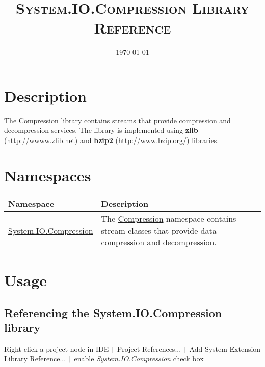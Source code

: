 \documentclass[a4paper,oneside,11.000000pt]{book}
\begin{document}
\clearpage

\frontmatter
\title{\textsc{System.IO.Compression Library Reference}
}
\date{\today}
\maketitle
\tableofcontents

\clearpage
\chapter{Description}
\begin{flushleft}
The \hyperlink{System.IO.Compression}{Compression} library contains streams that provide compression and decompression services.
The library is implemented using \textbf{zlib} (\url{http://wwww.zlib.net}) and
\textbf{bzip2} (\url{http://www.bzip.org/}) libraries.

\end{flushleft}
\chapter{Namespaces}
\begin{flushleft}
\begin{supertabular}[l]{!{\raggedright}p{5.49396cm}!{\raggedright}p{9.65604cm}}
\textbf{Namespace}
& \textbf{Description}
\\
\hline
\hyperlink{System.IO.Compression}{System.IO.Compression}
& The \hyperlink{System.IO.Compression}{Compression} namespace contains stream classes that provide data compression and decompression.

\\
\end{supertabular}

\end{flushleft}
\clearpage
\mainmatter

\chapter{Usage}

\section{Referencing the System.IO.Compression library}

Right-click a project node in IDE \verb.|. Project References... \verb.|.
Add System Extension Library Reference... \verb.|.
enable \emph{System.IO.Compression} check box
\end{document}
